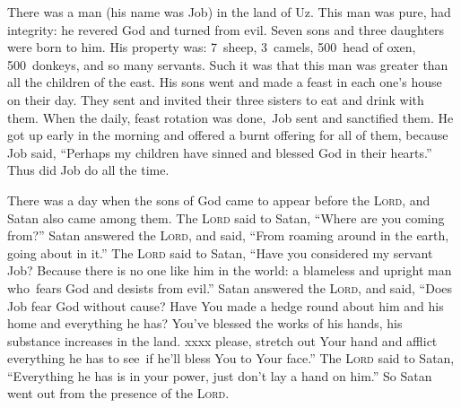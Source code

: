 
\begin{inparaenum}
   There was a man (his name was Job) in the land of Uz. This man was pure, had integrity: he revered God and turned from evil.%
   Seven sons and three daughters were born to him.%
   His property was: 7~sheep, 3~camels, 500~head of oxen, 500~donkeys, and so many servants. Such it was that this man was greater than all the children of the east.%
   His sons went and made a feast in each one's house on their day. They sent and invited their three sisters to eat and drink with them.%
   When the daily, feast rotation was done,\understood\ Job sent and sanctified them. He got up early in the morning and offered a burnt offering for all of them, because Job said, ``Perhaps my children have sinned and blessed God in their hearts.'' Thus did Job do all the time.%
  
   There was a day when the sons of God came to appear before the \textsc{Lord}, and Satan also came among them.%
   The \textsc{Lord} said to Satan, ``Where are you coming from?'' Satan answered the \textsc{Lord}, and said, ``From roaming around in the earth, going about in it.''%
   The \textsc{Lord} said to Satan, ``Have you considered my servant Job? Because there is no one like him in the world: a blameless and upright man who\understood\ fears God and desists from evil.''%
   Satan answered the \textsc{Lord}, and said, ``Does Job fear God without cause?%
   Have You made a hedge round about him and his home and everything he has? You've blessed the works of his hands, his substance increases in the land.%
   xxxx please, stretch out Your hand and afflict everything he has to see\understood\ if he'll bless You to Your face.''%
   The \textsc{Lord} said to Satan, ``Everything he has is in your power, just don't lay a hand on him.'' So Satan went out from the presence of the \textsc{Lord}.%
  

\end{inparaenum}
